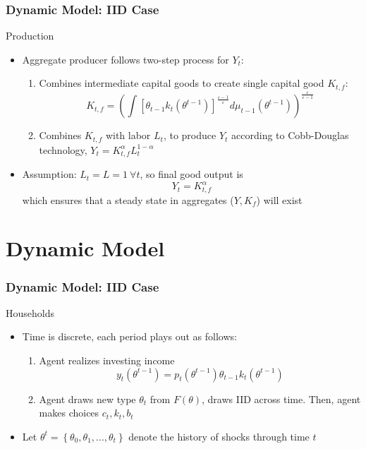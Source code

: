\documentclass{beamer}
\begin{document}
\begin{frame}
    \frametitle{Dynamic Model: IID Case}

    Production 
    \begin{itemize}
        \item Aggregate producer follows two-step process for \( Y_t \): 
        \begin{enumerate}
            \item Combines intermediate capital goods to create single capital good \( K_{t,f} \): 
            \begin{equation*}
                K_{t,f}=\left(\int\left[\theta_{t-1}k_{t}\left(\theta^{t-1}\right)\right]^{\frac{\varepsilon-1}{\varepsilon}}d\mu_{t-1}\left(\theta^{t-1}\right)\right)^{\frac{\varepsilon}{\varepsilon-1}}
            \end{equation*} 
            \item Combines \( K_{t,f} \) with labor \( L_t \), to produce \( Y_t \) according to Cobb-Douglas technology, \( Y_t = K_{t,f}^\alpha L_t^{1-\alpha} \)
        \end{enumerate}
        \item Assumption: \( L_t = L = 1 \ \forall t \), so final good output is 
            \begin{equation*}
                Y_t = K_{t,f}^\alpha
            \end{equation*}
            which ensures that a steady state in aggregates (\( Y,K_f \)) will exist
    \end{itemize}

\end{frame}

\section{Dynamic Model}
\begin{frame}
    \frametitle{Dynamic Model: IID Case}

    Households
    \begin{itemize}
        \item Time is discrete, each period plays out as follows: 
        \begin{enumerate}
            \item Agent realizes investing income 
            \begin{equation*}
                y_{t}\left(\theta^{t-1}\right)=p_{t}\left(\theta^{t-1}\right)\theta_{t-1}k_{t}\left(\theta^{t-1}\right)
            \end{equation*} 
            \item Agent draws new type \( \theta_t \) from \( F(\theta) \), draws IID across time. Then, agent makes choices \( c_t , k_t, b_t \)
        \end{enumerate} 
        \item Let $\theta^{t}=\left\{ \theta_{0},\theta_{1},...,\theta_{t}\right\} $ denote the history of shocks through time \( t \)
    \end{itemize}

\end{frame}
\end{document}
